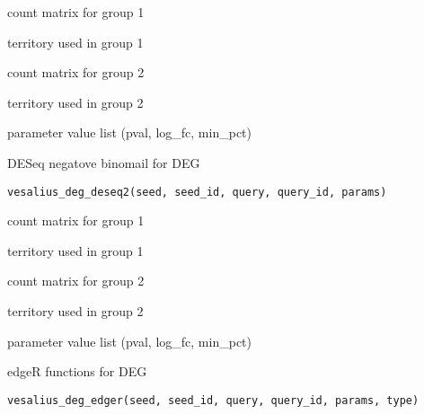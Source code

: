 \documentclass[a4paper]{book}
\begin{document}
%
\begin{Arguments}
\begin{ldescription}
\item[\code{seed}] count matrix for group 1

\item[\code{seed\_id}] territory used in group 1

\item[\code{query}] count matrix for group 2

\item[\code{query\_id}] territory used in group 2

\item[\code{params}] parameter value list (pval, log\_fc, min\_pct)
\end{ldescription}
\end{Arguments}
%
\begin{Description}
DESeq negatove binomail for DEG
\end{Description}
%
\begin{Usage}
\begin{verbatim}
vesalius_deg_deseq2(seed, seed_id, query, query_id, params)
\end{verbatim}
\end{Usage}
%
\begin{Arguments}
\begin{ldescription}
\item[\code{seed}] count matrix for group 1

\item[\code{seed\_id}] territory used in group 1

\item[\code{query}] count matrix for group 2

\item[\code{query\_id}] territory used in group 2

\item[\code{params}] parameter value list (pval, log\_fc, min\_pct)
\end{ldescription}
\end{Arguments}
%
\begin{Description}
edgeR functions for DEG
\end{Description}
%
\begin{Usage}
\begin{verbatim}
vesalius_deg_edger(seed, seed_id, query, query_id, params, type)
\end{verbatim}
\end{Usage}
\end{document}
